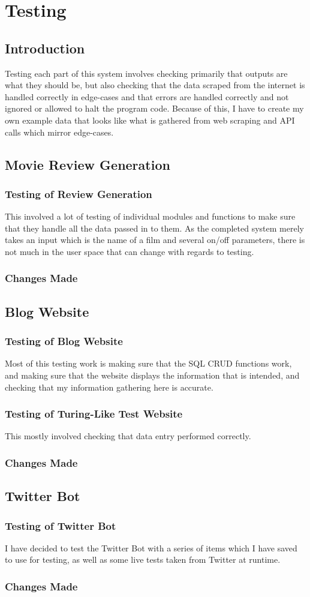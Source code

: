 \chapter{\label{ch:5-testing} Testing}


\section{Introduction}
Testing each part of this system involves checking primarily that outputs are what they should be, but also checking that the data scraped from the internet is handled correctly in edge-cases and that errors are handled correctly and not ignored or allowed to halt the program code. Because of this, I have to create my own example data that looks like what is gathered from web scraping and API calls which mirror edge-cases.

\section{Movie Review Generation}
\subsection{Testing of Review Generation}
This involved a lot of testing of individual modules and functions to make sure that they handle all the data passed in to them. As the completed system merely takes an input which is the name of a film and several on/off parameters, there is not much in the user space that can change with regards to testing.
\subsection{Changes Made}
\section{Blog Website}
\subsection{Testing of Blog Website}
Most of this testing work is making sure that the SQL CRUD functions work, and making sure that the website displays the information that is intended, and checking that my information gathering here is accurate.

\subsection{Testing of Turing-Like Test Website}
This mostly involved checking that data entry performed correctly.

\subsection{Changes Made}
\section{Twitter Bot}
\subsection{Testing of Twitter Bot}
I have decided to test the Twitter Bot with a series of items which I have saved to use for testing, as well as some live tests taken from Twitter at runtime. 
\subsection{Changes Made}

